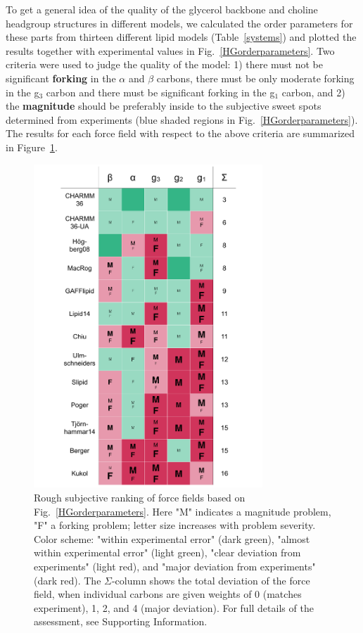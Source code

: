 \documentclass[journal=jpcbfk,manuscript=article]{achemso}
\begin{document}
To get a general idea of the quality of the glycerol backbone and choline headgroup structures in different models, we calculated 
the order parameters for these parts from thirteen different lipid models (Table~\ref{systems}) and 
plotted the results together with experimental values in Fig.~\ref{HGorderparameters}.
Two criteria were used to judge the quality of the model: 1) there must not be significant  {\bf forking} in the $\alpha$ and $\beta$ carbons,
there must be only moderate forking in the g$_3$ carbon and there must be significant forking in the g$_1$ carbon, and 2) the {\bf magnitude}
should be preferably inside to the subjective sweet spots determined from experiments (blue shaded regions in Fig.~\ref{HGorderparameters}).
The results for each force field with respect to the above criteria are summarized in Figure~\ref{FullHydrationComparisonTable}.
\begin{figure}[]
  \centering
  \includegraphics[width=8.6cm]{../DATAreportediINblog/comparisonTable.pdf}
  \newline
  \caption{\label{FullHydrationComparisonTable}
Rough subjective ranking of force fields based on Fig.~\ref{HGorderparameters}.
%
Here "M" indicates a magnitude problem, "F" a forking problem;
letter size increases with problem severity.
%
Color scheme:
"within experimental error" (dark green),
"almost within experimental error" (light green),
"clear deviation from experiments" (light red), and
"major deviation from experiments" (dark red).
%
The $\Sigma$-column shows the total deviation of the force field,
when individual carbons are given weights of 0 (matches experiment), 1, 2, and 4 (major deviation).
%
For full details of the assessment, see Supporting Information.
} 
\end{figure}
\end{document}
